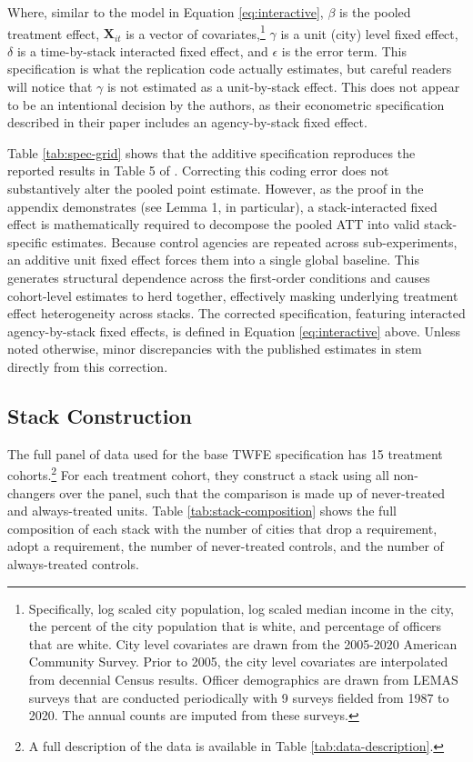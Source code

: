 \documentclass[12pt]{article}
\begin{document}
Where, similar to the model in Equation \ref{eq:interactive}, $\beta$ is the pooled treatment effect, $\mathbf{X}_{it}$ is a vector of covariates,\footnote{Specifically, log scaled city population, log scaled median income in the city, the percent of the city population that is white, and percentage of officers that are white. City level covariates are drawn from the 2005-2020 American Community Survey. Prior to 2005, the city level covariates are interpolated from decennial Census results. Officer demographics are drawn from LEMAS surveys that are conducted periodically with 9 surveys fielded from 1987 to 2020. The annual counts are imputed from these surveys.} $\gamma$ is a unit (city) level fixed effect, $\delta$ is a time-by-stack interacted fixed effect, and $\epsilon$ is the error term. This specification is what the replication code actually estimates, but careful readers will notice that $\gamma$ is not estimated as a unit-by-stack effect. This does not appear to be an intentional decision by the authors, as their econometric specification described in their paper includes an agency-by-stack fixed effect. 


Table \ref{tab:spec-grid} shows that the additive specification reproduces the reported results in Table 5 of \textcite{payson2025residency}. Correcting this coding error does not substantively alter the pooled point estimate. However, as the proof in the appendix demonstrates (see Lemma 1, in particular), a stack-interacted fixed effect is mathematically required to decompose the pooled ATT into valid stack-specific estimates. Because control agencies are repeated across sub-experiments, an additive unit fixed effect forces them into a single global baseline. This generates structural dependence across the first-order conditions and causes cohort-level estimates to herd together, effectively masking underlying treatment effect heterogeneity across stacks. The corrected specification, featuring interacted agency-by-stack fixed effects, is defined in Equation \ref{eq:interactive} above. Unless noted otherwise, minor discrepancies with the published estimates in \textcite{payson2025residency} stem directly from this correction.


\subsection{Stack Construction}

The full panel of data used for the base TWFE specification has 15 treatment cohorts.\footnote{A full description of the data is available in Table \ref{tab:data-description}.} For each treatment cohort, they construct a stack using all non-changers over the panel, such that the comparison is made up of never-treated and always-treated units. Table \ref{tab:stack-composition} shows the full composition of each stack with the number of cities that drop a requirement, adopt a requirement, the number of never-treated controls, and the number of always-treated controls. 
\end{document}
